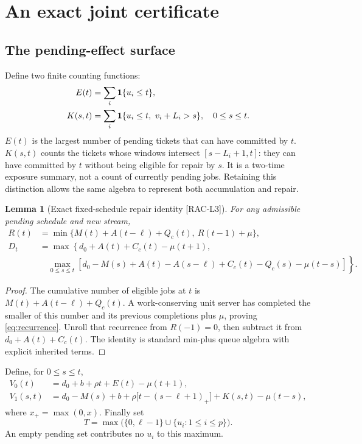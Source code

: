 \documentclass[11pt,a4paper]{article}
\newtheorem{lemma}[theorem]{Lemma}
\theoremstyle{definition}\newtheorem{definition}{Definition}
\newcommand{\idtag}[1]{\textnormal{\textsf{[#1]}}}
\begin{document}
\section{An exact joint certificate}
\label{sec:theorem}
\subsection{The pending-effect surface}
Define two finite counting functions:
\begin{align}
E(t)&=\sum_i\mathbf 1\{u_i\le t\},\label{eq:E}\\
K(s,t)&=\sum_i\mathbf 1\{u_i\le t,\ v_i+L_i>s\},\quad 0\le s\le t.\label{eq:K}
\end{align}
$E(t)$ is the largest number of pending tickets that can have committed by $t$. $K(s,t)$ counts the tickets whose windows intersect $[s-L_i+1,t]$: they can have committed by $t$ without being eligible for repair by $s$. It is a two-time exposure summary, not a count of currently pending jobs. Retaining this distinction allows the same algebra to represent both accumulation and repair.

\begin{lemma}[Exact fixed-schedule repair identity \idtag{RAC-L3}]
\label{lem:trace}
For any admissible pending schedule and new stream,
\begin{align}
R(t)&=\min\{M(t)+A(t-\ell)+Q_c(t),\ R(t-1)+\mu\},\label{eq:recurrence}\\
D_t&=\max\left\{d_0+A(t)+C_c(t)-\mu(t+1),\right.\nonumber\\
&\quad\left.\max_{0\le s\le t}\left[d_0-M(s)+A(t)-A(s-\ell)
+C_c(t)-Q_c(s)-\mu(t-s)\right]\right\}.
\label{eq:trace}
\end{align}
\end{lemma}
\begin{proof}
The cumulative number of eligible jobs at $t$ is $M(t)+A(t-\ell)+Q_c(t)$. A work-conserving unit server has completed the smaller of this number and its previous completions plus $\mu$, proving \cref{eq:recurrence}. Unroll that recurrence from $R(-1)=0$, then subtract it from $d_0+A(t)+C_c(t)$. The identity is standard min-plus queue algebra with explicit inherited terms.
\end{proof}

Define, for $0\le s\le t$,
\begin{align}
V_0(t)&=d_0+b+\rho t+E(t)-\mu(t+1),\label{eq:V0}\\
V_1(s,t)&=d_0-M(s)+b+\rho\big[t-(s-\ell+1)_+\big]
+K(s,t)-\mu(t-s),\label{eq:V1}
\end{align}
where $x_+=\max(0,x)$. Finally set
\begin{equation}
T=\max\big(\{0,\ell-1\}\cup\{u_i:1\le i\le p\}\big).
\label{eq:T}
\end{equation}
An empty pending set contributes no $u_i$ to this maximum.
\end{document}
